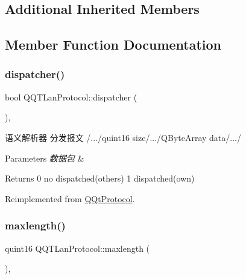 \subsection*{Additional Inherited Members}


\subsection{Member Function Documentation}
\mbox{\label{class_q_q_t_lan_protocol_ac2fc1658a5c00670974f4e845226c419}} 
\subsubsection{\texorpdfstring{dispatcher()}{dispatcher()}}
{\footnotesize\ttfamily bool Q\+Q\+T\+Lan\+Protocol\+::dispatcher (\begin{DoxyParamCaption}\item[{const Q\+Byte\+Array \&}]{ }\end{DoxyParamCaption})\hspace{0.3cm}{\ttfamily [override]}, {\ttfamily [virtual]}}



语义解析器 分发报文 /.../quint16 size/.../\+Q\+Byte\+Array data/.../ 


\begin{DoxyParams}{Parameters}
{\em 数据包} & \\
\hline
\end{DoxyParams}
\begin{DoxyReturn}{Returns}
0 no dispatched(others) 1 dispatched(own) 
\end{DoxyReturn}


Reimplemented from \mbox{\hyperlink{class_q_qt_protocol_a35a69c4b89c8cf7459038f40d75e0dc9}{Q\+Qt\+Protocol}}.

\mbox{\label{class_q_q_t_lan_protocol_a05999312ac6df3ce5790d889f2bdc826}} 
\subsubsection{\texorpdfstring{maxlength()}{maxlength()}}
{\footnotesize\ttfamily quint16 Q\+Q\+T\+Lan\+Protocol\+::maxlength (\begin{DoxyParamCaption}{ }\end{DoxyParamCaption})\hspace{0.3cm}{\ttfamily [override]}, {\ttfamily [virtual]}}



